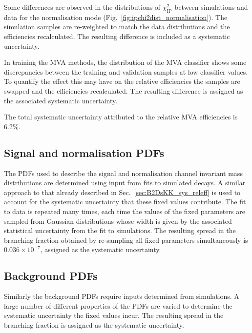 \begin{description}
Some differences are observed in the distributions of $\chi^{2}_{\text{IP}}$ between simulations and data for the normalisation mode (Fig.~\ref{fig:ipchi2dist_normalisation}). The simulation samples are re-weighted to match the data distributions and the efficiencies recalculated. The resulting difference is included as a systematic uncertainty.

In training the MVA methods, the distribution of the MVA classifier shows some discrepancies between the training and validation samples at low classifier values. To quantify the effect this may have on the relative efficiencies the samples are swapped and the efficiencies recalculated. The resulting difference is assigned as the associated systematic uncertainty.

The total systematic uncertainty attributed to the relative MVA efficiencies is 6.2\%.
\end{description}

\subsection{Signal and normalisation PDFs}

The PDFs used to describe the signal and normalisation channel invariant mass distributions are determined using input from fits to simulated decays. A similar approach to that already described in Sec.~\ref{sec:B2DsKK_sys_releff} is used to account for the systematic uncertainty that these fixed values contribute. The fit to data is repeated many times, each time the values of the fixed parameters are sampled from Gaussian distributions whose width is given by the associated statistical uncertainty from the fit to simulations. The resulting spread in the branching fraction obtained by re-sampling all fixed parameters simultaneously is $0.036\times10^{-7}$, assigned as the systematic uncertainty.

\subsection{Background PDFs}
Similarly the background PDFs require inputs determined from simulations. A large number of different properties of the PDFs are varied to determine the systematic uncertainty the fixed values incur. The resulting spread in the branching fraction is assigned as the systematic uncertainty. 

